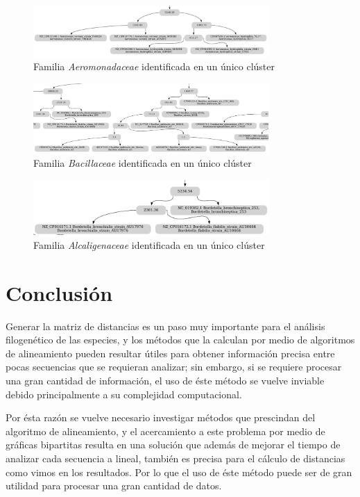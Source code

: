 \documentclass[12pt]{article}
\begin{document}
\begin{figure}[h!]
  \centering
  \includegraphics[width=0.8\textwidth]{Aeromonadaceae}
  \caption{Familia \textit{Aeromonadaceae} identificada en un único clúster}
\end{figure}

\begin{figure}[h!]
  \centering
  \includegraphics[width=0.8\textwidth]{Bacillaceae}
  \caption{Familia \textit{Bacillaceae} identificada en un único clúster}
\end{figure}

\begin{figure}[h!]
  \centering
  \includegraphics[width=0.8\textwidth]{Alcaligenaceae}
  \caption{Familia \textit{Alcaligenaceae} identificada en un único clúster}
\end{figure}

\newpage

\section{Conclusión}

\noindent Generar la matriz de distancias es un paso muy importante para el análisis filogenético de las especies, y los métodos que la calculan por medio de algoritmos de alineamiento pueden resultar útiles para obtener información precisa entre pocas secuencias que se requieran analizar; sin embargo, si se requiere procesar una gran cantidad de información, el uso de éste método se vuelve inviable debido principalmente a su complejidad computacional.

Por ésta razón se vuelve necesario investigar métodos que prescindan del algoritmo de alineamiento, y el acercamiento a este problema por medio de gráficas bipartitas resulta en una solución que además de mejorar el tiempo de analizar cada secuencia a lineal, también es precisa para el cálculo de distancias como vimos en los resultados. Por lo que el uso de éste método puede ser de gran utilidad para procesar una gran cantidad de datos.
\end{document}
